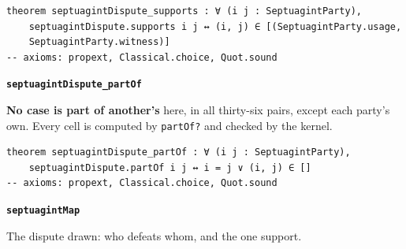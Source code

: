 \documentclass[11pt]{article}
\begin{document}
{\small\begin{verbatim}
theorem septuagintDispute_supports : ∀ (i j : SeptuagintParty),
    septuagintDispute.supports i j ↔ (i, j) ∈ [(SeptuagintParty.usage,
    SeptuagintParty.witness)]
-- axioms: propext, Classical.choice, Quot.sound
\end{verbatim}}
\par\medskip\noindent\textbf{\texttt{septuagint\allowbreak{}Dispute\_\allowbreak{}part\allowbreak{}Of}}\par\nobreak\noindent
\textbf{No case is part of another’s} here, in all thirty-six pairs, except each party’s own. Every cell is computed by \texttt{part\allowbreak{}Of?} and checked by the kernel.

{\small\begin{verbatim}
theorem septuagintDispute_partOf : ∀ (i j : SeptuagintParty),
    septuagintDispute.partOf i j ↔ i = j ∨ (i, j) ∈ []
-- axioms: propext, Classical.choice, Quot.sound
\end{verbatim}}
\par\medskip\noindent\textbf{\texttt{septuagint\allowbreak{}Map}}\par\nobreak\noindent
The dispute drawn: who defeats whom, and the one support.
\end{document}
